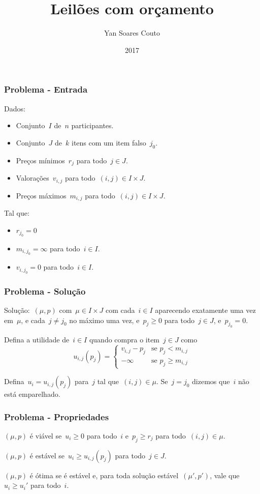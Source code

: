 \documentclass[10pt, compress]{beamer}
\title{Leilões com orçamento}
\subtitle{Yan Soares Couto}
\date{2017}
\institute{Instituto de Matemática e Estatística}
\begin{document}
\maketitle

\begin{frame}[fragile]
	\frametitle{Problema - Entrada}

	Dados:
	\begin{itemize}
		\item Conjunto~$I$ de~$n$ participantes.
		\item Conjunto~$J$ de~$k$ itens com um item falso~$j_0$.
		\item Preços mínimos~$r_j$ para todo~$j \in J$.
		\item Valorações~$v_{i,j}$ para todo~$(i, j) \in I \times J$.
		\item Preços máximos~$m_{i,j}$ para todo~$(i, j) \in I \times J$.
	\end{itemize}

	Tal que:
	\begin{itemize}
		\item $r_{j_0} = 0$
		\item $m_{i, j_0} = \infty$ para todo~$i \in I$.
		\item $v_{i, j_0} = 0$ para todo~$i \in I$.
	\end{itemize}

\end{frame}

\begin{frame}[fragile]
	\frametitle{Problema - Solução}

	Solução:~$(\mu, p)$ com~$\mu \in I \times J$ com cada~$i \in I$ aparecendo exatamente uma vez em~$\mu$, e cada~$j \neq j_0$ no máximo uma vez, e~$p_j \geq 0$ para todo~$j \in J$, e~$p_{j_0} = 0$.
	\vfill

	Defina a utilidade de~$i \in I$ quando compra o item~$j \in J$ como
		$$ u_{i,j}(p_j) = \left\{
			\begin{array}{ll}
				v_{i,j} - p_j & \text{se $p_j < m_{i,j}$} \\
					-\infty & \text{se $p_j \geq m_{i, j}$}
			\end{array} \right.
				$$
	\vfill

	Defina~$u_i = u_{i,j}(p_j)$ para~$j$ tal que~$(i, j) \in \mu$. Se~$j = j_0$ dizemos que~$i$ \alert{não está emparelhado}.

\end{frame}

\begin{frame}[fragile]
	\frametitle{Problema - Propriedades}

	$(\mu, p)$ é \alert{viável} se~$u_i \geq 0$ para todo~$i$ e~$p_j \geq r_j$ para todo~$(i, j) \in \mu$.
	\vfill

	$(\mu, p)$ é \alert{estável} se~$u_i \geq u_{i,j}(p_j)$ para todo~$j \in J$.
	\vfill

	$(\mu, p)$ é \alert{ótima} se é estável e, para toda solução estável~$(\mu', p')$, vale que~$u_i \geq u_i'$ para todo~$i$.
\end{frame}
\end{document}
